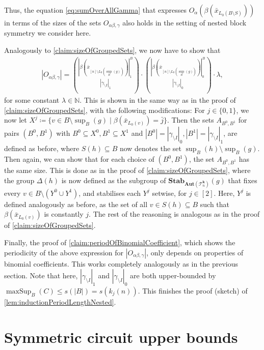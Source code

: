 \documentclass[11pt]{article}
\DeclareMathOperator{\supp}{sup}
\DeclareMathOperator{\maxSup}{maxSup}
\newcommand{\Aut}{\mathbf{Aut}}
\newcommand{\Stab}{\mathbf{Stab}}
\newcommand{\bbN}{\mathbb{N}}
\newcommand{\Tt}{{\mathcal T}}
\theoremstyle{definition}
\theoremstyle{plain}
\theoremstyle{remark}
\theoremstyle{remark}
\begin{document}
Thus, the equation \eqref{eq:sumOverAllGamma} that expresses $O_{\alpha}(\beta(\bar{x}_{L_0(B \setminus S)}))$ in terms of the sizes of the sets $O_{\alpha\beta,\gamma}$ also holds in the setting of nested block symmetry we consider here.

Analogously to \cref{claim:sizeOfGroupedSets}, we now have to show that 
\begin{align*}
	|O_{\alpha\beta, \gamma}| = 
	\binom{|\beta(\bar{x}_{[n] \setminus L_0(\supp_{B}(g))})|_1^B }{|\gamma_{\setminus I}|_1} \cdot \binom{|\beta(\bar{x}_{[n] \setminus L_0(\supp_{B}(g))})|_0^B }{|\gamma_{\setminus I}|_0} \cdot \lambda,
\end{align*}
for some constant $\lambda \in \bbN$. This is shown in the same way as in the proof of \cref{claim:sizeOfGroupedSets}, with the following modifications:
For $j \in \{0,1\}$, we now let $X^j \coloneqq \{  v \in B \setminus \supp_B(g) \mid \beta(\bar{x}_{L_0(v)}) = \bar{j}   \}$. Then the sets $A_{B^0,B^1}$ for pairs $(B^0, B^1)$ with $B^0 \subseteq X^0, B^1 \subseteq X^1$ and $|B^0| = |\gamma_{\setminus I}|_0, |B^1| = |\gamma_{\setminus I}|_1$, are defined as before, where $S(h) \subseteq B$ now denotes the set $\supp_B(h) \setminus \supp_B(g)$.
Then again, we can show that for each choice of $(B^0,B^1)$, the set $A_{B^0,B^1}$ has the same size. This is done as in the proof of \cref{claim:sizeOfGroupedSets}, where the group $\Delta(h)$ is now defined as the subgroup of $\Stab_{\Aut(\Tt^{\boldsymbol{k}}_n)}(g)$ that fixes every $v \in B \setminus (Y^0 \cup Y^1)$, and stabilises each $Y^j$ setwise, for $j \in [2]$. Here, $Y^j$ is defined analogously as before, as the set of all $v \in S(h) \subseteq B$ such that $\beta(\bar{x}_{L_0(v)})$ is constantly $j$. The rest of the reasoning is analogous as in the proof of \cref{claim:sizeOfGroupedSets}.

Finally, the proof of \cref{claim:periodOfBinomialCoefficient}, which shows the periodicity of the above expression for $|O_{\alpha\beta, \gamma}|$, only depends on properties of binomial coefficients. This works completely analogously as in the previous section. Note that here, $|\gamma_{\setminus I}|_1$ and $|\gamma_{\setminus I}|_0$ are both upper-bounded by $\maxSup_B(C) \leq s(|B|) = s(k_j(n))$.
This finishes the proof (sketch) of \cref{lem:inductionPeriodLengthNested}.








\section{Symmetric circuit upper bounds}
\label{sec:upperbound}
\end{document}
